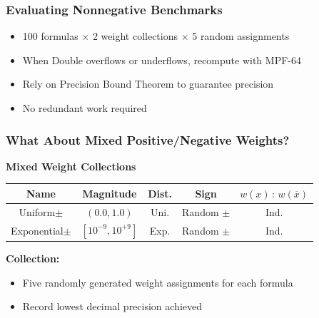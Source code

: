 \documentclass[t,pdf]{beamer}
\newcommand{\obar}[1]{\overline{#1}}
\begin{document}
\begin{frame}

\frametitle{Evaluating Nonnegative Benchmarks}

\bigskip


\medskip

\begin{itemize}
\item 100 formulas $\times$ 2 weight collections $\times$ 5 random assignments
\item When Double overflows or underflows, recompute with MPF-64
\item Rely on Precision Bound Theorem to guarantee precision
\item No redundant work required
\end{itemize}

\end{frame}


\begin{frame}
  \frametitle{What About Mixed Positive/Negative Weights?}

\medskip

  \textbf{Mixed Weight Collections}

\begin{center}
   \begin{tabular}{ccccc}
     Name & Magnitude  & Dist. & Sign & $w(x)\,:\,w(\obar{x})$ \\
     \midrule
     Uniform$\pm$      & $(0.0, 1.0)$     & Uni.  & Random $\pm$   & Ind. \\[0.5em]
     Exponential$\pm$ & $[10^{-9}, 10^{+9}]$ & Exp. & Random $\pm$ & Ind. \\
   \end{tabular}
\end{center}

\bigskip

\textbf{Collection:}

  \begin{itemize}
    \item Five randomly generated weight assignments for each formula
    \item Record lowest decimal precision achieved
  \end{itemize}

\end{frame}
\end{document}

